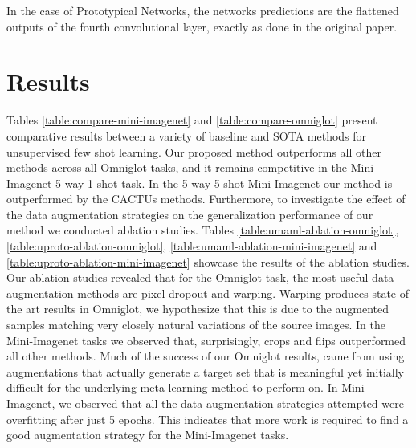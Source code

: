 \documentclass{article}
\begin{document}
In the case of Prototypical Networks, the networks predictions are the flattened outputs of the fourth convolutional layer, exactly as done in the original paper.











\section{Results}
Tables \ref{table:compare-mini-imagenet} and \ref{table:compare-omniglot} present comparative results between a variety of baseline and SOTA methods for unsupervised few shot learning. Our proposed method outperforms all other methods across all Omniglot tasks, and it remains competitive in the Mini-Imagenet 5-way 1-shot task. In the 5-way 5-shot Mini-Imagenet our method is outperformed by the CACTUs methods. Furthermore, to investigate the effect of the data augmentation strategies on the generalization performance of our method we conducted ablation studies. Tables \ref{table:umaml-ablation-omniglot}, \ref{table:uproto-ablation-omniglot}, \ref{table:umaml-ablation-mini-imagenet} and \ref{table:uproto-ablation-mini-imagenet} showcase the results of the ablation studies. Our ablation studies revealed that for the Omniglot task, the most useful data augmentation methods are pixel-dropout and warping. Warping produces state of the art results in Omniglot, we hypothesize that this is due to the augmented samples matching very closely natural variations of the source images. In the Mini-Imagenet tasks we observed that, surprisingly, crops and flips outperformed all other methods. Much of the success of our Omniglot results, came from using augmentations that actually generate a target set that is meaningful yet initially difficult for the underlying meta-learning method to perform on. In Mini-Imagenet, we observed that all the data augmentation strategies attempted were overfitting after just 5 epochs. This indicates that more work is required to find a good augmentation strategy for the Mini-Imagenet tasks. 
\end{document}
